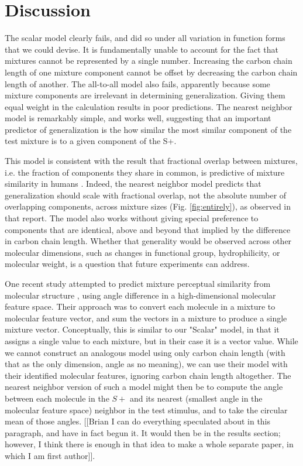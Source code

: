 \section*{Discussion}
\label{sec:discussion}
The scalar model clearly fails, and did so under all variation in function forms that we could devise.  It is fundamentally unable to account for the fact that mixtures cannot be represented by a single number.  Increasing the carbon chain length of one mixture component cannot be offset by decreasing the carbon chain length of another.  The all-to-all model also fails, apparently because some mixture components are irrelevant in determining generalization.  Giving them equal weight in the calculation results in poor predictions.  The nearest neighbor model is remarkably simple, and works well, suggesting that an important predictor of generalization is the how similar the most similar component of the test mixture is to a given component of the S+.  

This model is consistent with the result that fractional overlap between mixtures, i.e. the fraction of components they share in common, is predictive of mixture similarity in humans \cite{24653035}.  Indeed, the nearest neighbor model predicts that generalization should scale with fractional overlap, not the absolute number of overlapping components, across mixture sizes (Fig. \ref{fig:entirely}), as observed in that report.  The model also works without giving special preference to components that are identical, above and beyond that implied by the difference in carbon chain length.  Whether that generality would be observed across other molecular dimensions, such as changes in functional group, hydrophilicity, or molecular weight, is a question that future experiments can address.  

One recent study attempted to predict mixture perceptual similarity from molecular structure \cite{24068899}, using angle difference in a high-dimensional molecular feature space.  Their approach was to convert each molecule in a mixture to molecular feature vector, and sum the vectors in a mixture to produce a single mixture vector.  Conceptually, this is similar to our "Scalar" model, in that it assigns a single value to each mixture, but in their case it is a vector value.  While we cannot construct an analogous model using only carbon chain length (with that as the only dimension, angle as no meaning), we can use their model with their identified molecular features, ignoring carbon chain length altogether.  The nearest neighbor version of such a model might then be to compute the angle between each molecule in the $S+$ and its nearest (smallest angle in the molecular feature space) neighbor in the test stimulus, and to take the circular mean of those angles.  [[Brian I can do everything speculated about in this paragraph, and have in fact begun it. It would then be in the results section; however, I think there is enough in that idea to make a whole separate paper, in which I am first author]].  